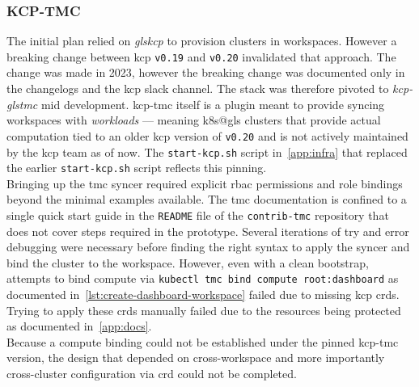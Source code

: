 \documentclass[11pt, a4paper, oneside, listof=totoc]{scrartcl}
\begin{document}
            \subsubsection{KCP-TMC}\label{subsubsec:challengesKCPTMC}
                The initial plan relied on \emph{gls{kcp}} to provision clusters in workspaces.
                However a breaking change between \gls{kcp} \texttt{v0.19} and \texttt{v0.20}
                invalidated that approach.
                The change was made in 2023, however the breaking change was documented only in
                the changelogs and the \gls{kcp} slack channel.
                The stack was therefore pivoted to \emph{\gls{kcp}-gls{tmc}} mid development.
                \gls{kcp}-\gls{tmc} itself is a plugin meant to provide syncing workspaces with
                \textit{workloads} --- meaning \gls{k8s@gls} clusters that provide actual
                computation tied to an older \gls{kcp} version of \texttt{v0.20} and is not actively
                maintained by the \gls{kcp} team as of now.
                The \texttt{start-kcp.sh} script in~\autoref{app:infra} that replaced the earlier
                \texttt{start-kcp.sh} script reflects this pinning.\\
                Bringing up the \gls{tmc} syncer required explicit \gls{rbac} permissions and
                role bindings beyond the minimal examples available.
                The \gls{tmc} documentation is confined to a single quick start guide in the
                \texttt{README} file of the \texttt{contrib-tmc} repository that does not cover
                steps required in the prototype.
                Several iterations of try and error debugging were necessary before finding the
                right syntax to apply the syncer and bind the cluster to the workspace.
                However, even with a clean bootstrap, attempts to bind compute via
                \texttt{kubectl tmc bind compute root:dashboard} as documented
                in~\autoref{lst:create-dashboard-workspace} failed due to missing \gls{kcp}
                \glspl{crd}.
                Trying to apply these \glspl{crd} manually failed due to the resources being
                protected as documented in~\autoref{app:docs}.\\
                Because a compute binding could not be established under the pinned
                \gls{kcp}-\gls{tmc} version, the design that depended on cross-workspace and more
                importantly cross-cluster configuration via \gls{crd} could not be completed.
\end{document}
